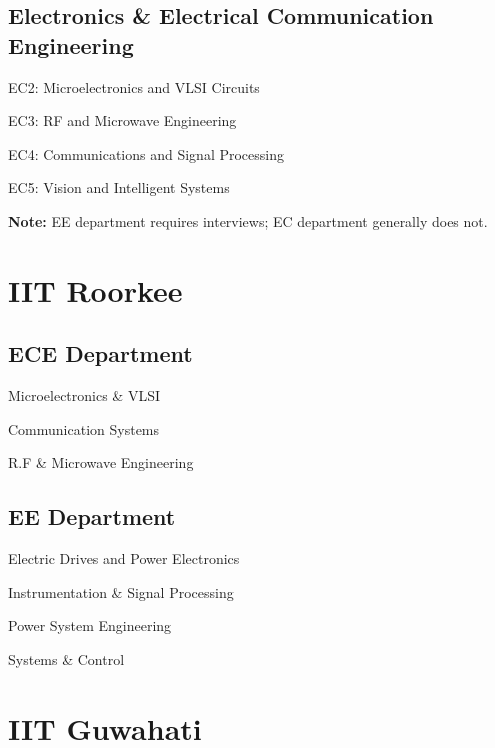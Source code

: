 \subsection*{Electronics \& Electrical Communication Engineering}
\begin{pfChecklist}
  \item EC2: Microelectronics and VLSI Circuits
  \item EC3: RF and Microwave Engineering
  \item EC4: Communications and Signal Processing
  \item EC5: Vision and Intelligent Systems
\end{pfChecklist}

\noindent\textbf{Note:} EE department requires interviews; EC department
generally does not.

\section{IIT Roorkee}
\label{sec:iitr}

\subsection*{ECE Department}
\begin{pfChecklist}
  \item Microelectronics \& VLSI
  \item Communication Systems
  \item R.F \& Microwave Engineering
\end{pfChecklist}

\subsection*{EE Department}
\begin{pfChecklist}
  \item Electric Drives and Power Electronics
  \item Instrumentation \& Signal Processing
  \item Power System Engineering
  \item Systems \& Control
\end{pfChecklist}

\section{IIT Guwahati}
\label{sec:iitg}

